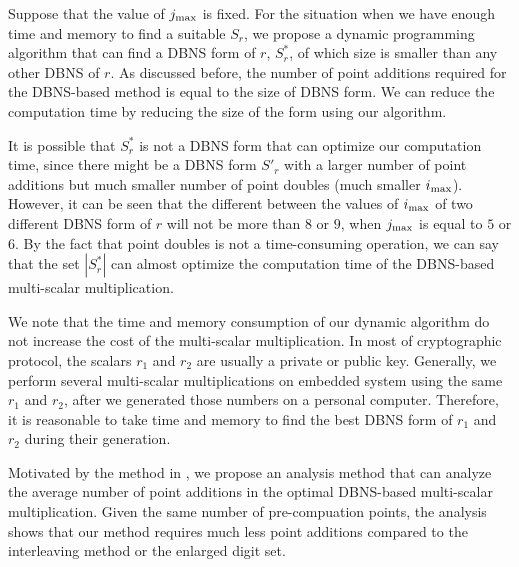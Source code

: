 Suppose that the value of $j_{\rm max}$ is fixed. For the situation when we have enough time and memory to find a suitable $S_r$, we propose a dynamic programming algorithm that can find a DBNS form of $r$, $S^*_r$, of which size is smaller than any other DBNS of $r$. As discussed before, the number of point additions required for the DBNS-based method is equal to the size of DBNS form. We can reduce the computation time by reducing the size of the form using our algorithm.

It is possible that $S^*_r$ is not a DBNS form that can optimize our computation time, since there might be a DBNS form $S'_r$ with a larger number of point additions but much smaller number of point doubles (much smaller $i_{\rm max}$). However, it can be seen that the different between the values of $i_{\rm max}$ of two different DBNS form of $r$ will not be more than $8$ or $9$, when $j_{\rm max}$ is equal to $5$ or $6$. By the fact that point doubles is not a time-consuming operation, we can say that the set $|S^*_r|$ can almost optimize the computation time of the DBNS-based multi-scalar multiplication.

We note that the time and memory consumption of our dynamic algorithm do not increase the cost of the multi-scalar multiplication. In most of cryptographic protocol, the scalars $r_1$ and $r_2$ are usually a private or public key. Generally, we perform several multi-scalar multiplications on embedded system using the same $r_1$ and $r_2$, after we generated those numbers on a personal computer. Therefore, it is reasonable to take time and memory to find the best DBNS form of $r_1$ and $r_2$ during their generation.

Motivated by the method in \cite{analysisMethod}, we propose an analysis method that can analyze the average number of point additions in the optimal DBNS-based multi-scalar multiplication. Given the same number of pre-compuation points, the analysis shows that our method requires much less point additions compared to the interleaving method or the enlarged digit set.

 
